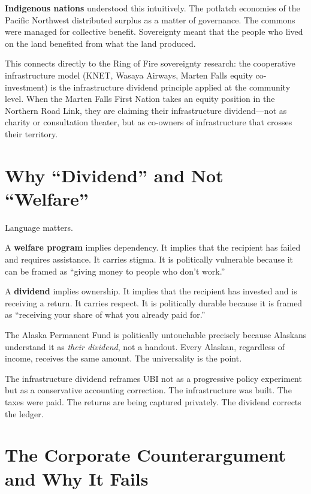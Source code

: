 \documentclass[11pt,letterpaper]{article}
\begin{document}
\textbf{Indigenous nations} understood this intuitively. The potlatch economies of the Pacific Northwest distributed surplus as a matter of governance. The commons were managed for collective benefit. Sovereignty meant that the people who lived on the land benefited from what the land produced.

This connects directly to the Ring of Fire sovereignty research: the cooperative infrastructure model (KNET, Wasaya Airways, Marten Falls equity co-investment) is the infrastructure dividend principle applied at the community level. When the Marten Falls First Nation takes an equity position in the Northern Road Link, they are claiming their infrastructure dividend---not as charity or consultation theater, but as co-owners of infrastructure that crosses their territory.

\section{Why ``Dividend'' and Not ``Welfare''}

Language matters.

A \textbf{welfare program} implies dependency. It implies that the recipient has failed and requires assistance. It carries stigma. It is politically vulnerable because it can be framed as ``giving money to people who don't work.''

A \textbf{dividend} implies ownership. It implies that the recipient has invested and is receiving a return. It carries respect. It is politically durable because it is framed as ``receiving your share of what you already paid for.''

The Alaska Permanent Fund is politically untouchable precisely because Alaskans understand it as \emph{their dividend}, not a handout. Every Alaskan, regardless of income, receives the same amount. The universality is the point.

The infrastructure dividend reframes UBI not as a progressive policy experiment but as a conservative accounting correction. The infrastructure was built. The taxes were paid. The returns are being captured privately. The dividend corrects the ledger.

\section{The Corporate Counterargument and Why It Fails}
\end{document}
